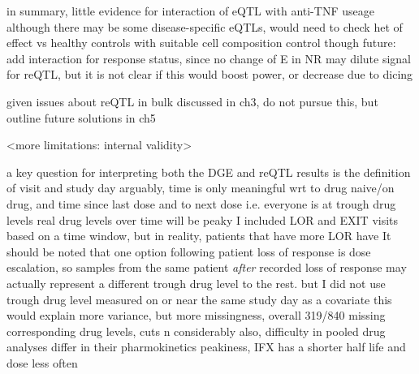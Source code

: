 \begin{outline}
    \2 in summary, little evidence for interaction of eQTL with anti-TNF useage
        \3 although there may be some disease-specific eQTLs, would need to check het of effect vs healthy controls with suitable cell composition control though
        \3 future: add interaction for response status, since no change of E in NR may dilute signal for reQTL, but it is not clear if this would boost power, or decrease due to dicing

    \2 given issues about reQTL in bulk discussed in ch3, do not pursue this, but outline future solutions in ch5

\1 <more limitations: internal validity>

    \2 a key question for interpreting both the DGE and reQTL results is the definition of visit and study day
        \3 arguably, time is only meaningful wrt to drug naive/on drug, and time since last dose and to next dose i.e. everyone is at trough drug levels
        \3 real drug levels over time will be peaky
        \3 I included LOR and EXIT visits based on a time window, but in reality, patients that have more LOR have 
        \3 It should be noted that one option following patient loss of response is dose escalation, so samples from the same patient \emph{after} recorded loss of response may actually represent a different trough drug level to the rest.
        \3 but I did not use trough drug level measured on or near the same study day as a covariate
        \3 this would explain more variance, but
            more missingness, overall 319/840 missing corresponding drug levels, cuts n considerably
        \3 also, difficulty in pooled drug analyses
        \3 differ in their pharmokinetics peakiness, IFX has a shorter half life and dose less often \autocite{lichtenstein2013ComprehensiveReviewAntitumor}


\end{outline}

